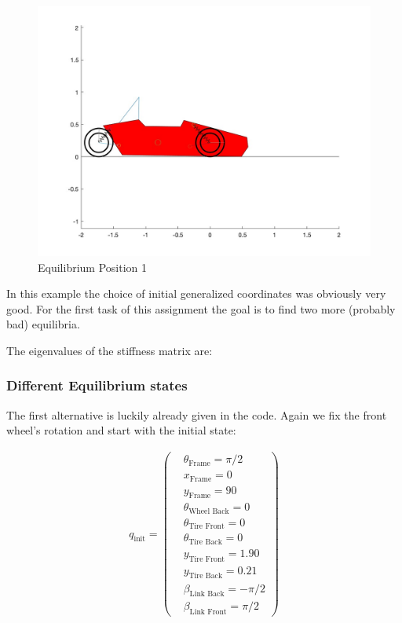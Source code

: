 \begin{figure}[ht]
    \centering
    \includegraphics[scale=0.235]{images/Equilibrium1.jpg}
    \caption{Equilibrium Position 1}
    \label{fig:eq_1}
\end{figure}

\noindent In this example the choice of initial generalized coordinates was obviously very good. For the first task of this assignment the goal is to find two more (probably bad) equilibria.

The eigenvalues of the stiffness matrix are:




\subsubsection{Different Equilibrium states}

The first alternative is luckily already given in the code. Again we fix the front wheel's rotation and start with the initial state:

\begin{equation}\label{eq:4.5.3}
    \begin{split}
        q_{\text{init}} = 
        \begin{pmatrix}
            &\theta_{\text{Frame}} = \pi/2\\
            &x_{\text{Frame}} = 0\\
            &y_{\text{Frame}} = 90\\
            &\theta_{\text{Wheel Back}} = 0\\
            &\theta_{\text{Tire Front}} = 0\\
            &\theta_{\text{Tire Back}} = 0\\
            &y_{\text{Tire Front}} = 1.90\\
            &y_{\text{Tire Back}} = 0.21\\
            &\beta_{\text{Link Back}} = -\pi/2\\
            &\beta_{\text{Link Front}} = \pi/2
        \end{pmatrix}
    \end{split}
\end{equation}

